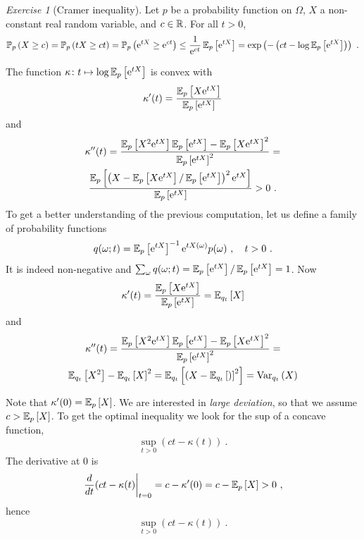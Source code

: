 \documentclass[12pt,a4paper]{amsart}
\theoremstyle{plain}%
\theoremstyle{definition}
\theoremstyle{remark}
\newtheorem{exercise}{Exercise}
\begin{document}
\begin{exercise}[Cramer inequality] \label{ex:cramer}
Let $p$ be a probability function on $\Omega$, $X$ a non-constant real random variable, and $c \in \mathbb{R}$. For all $t > 0$,
\begin{equation*}
  \operatorname{\mathbb P}_{p}\left( X \geq c\right) = \operatorname{\mathbb P}_{p}\left(tX \geq ct\right) = \operatorname{\mathbb P}_{p}\left(\mathrm{e}^{tX} \geq \mathrm{e}^{ct}\right) \leq \frac1{\mathrm{e}^{ct}} \operatorname{\mathbb E}_{p}\left[\mathrm{e}^{tX}\right] = \exp\left(- \left(ct - \log\operatorname{\mathbb E}_{p}\left[\mathrm{e}^{tX}\right]\right)\right) \ . 
\end{equation*}

The function $\kappa \colon t \mapsto \log \operatorname{\mathbb E}_{p}\left[\mathrm{e}^{tX}\right]$ is convex with
\begin{equation*}
  \kappa'(t) = \frac{\operatorname{\mathbb E}_{p}\left[X \mathrm{e}^{tX}\right]}{\operatorname{\mathbb E}_{p}\left[\mathrm{e}^{tX}\right]} 
\end{equation*}
and
\begin{multline*}
  \kappa''(t) = \frac{\operatorname{\mathbb E}_{p}\left[X^2\mathrm{e}^{tX}\right]\operatorname{\mathbb E}_{p}\left[\mathrm{e}^{tX}\right] - \operatorname{\mathbb E}_{p}\left[X\mathrm{e}^{tX}\right]^2}{\operatorname{\mathbb E}_{p}\left[\mathrm{e}^{tX}\right]^2} = \\ \frac{\operatorname{\mathbb E}_{p}\left[\left(X - \operatorname{\mathbb E}_{p}\left[X \mathrm{e}^{tX}\right]/\operatorname{\mathbb E}_{p}\left[\mathrm{e}^{tX}\right] \right)^2 \mathrm{e}^{tX}\right]}{\operatorname{\mathbb E}_{p}\left[\mathrm{e}^{tX}\right]} > 0 \ .
\end{multline*}
To get a better understanding of the previous computation, let us define a family of probability functions
\begin{equation*}
  q(\omega;t) = \operatorname{\mathbb E}_{p}\left[\mathrm{e}^{tX}\right]^{-1} \mathrm{e}^{tX(\omega)} p(\omega) \ , \quad t >0 \ .
\end{equation*}
It is indeed non-negative and $\sum_\omega q(\omega;t) = \operatorname{\mathbb E}_{p}\left[\mathrm{e}^{tX}\right] / \operatorname{\mathbb E}_{p}\left[\mathrm{e}^{tX}\right] = 1$. Now
\begin{equation*}
  \kappa'(t) = \frac{\operatorname{\mathbb E}_{p}\left[X \mathrm{e}^{tX}\right]}{\operatorname{\mathbb E}_{p}\left[\mathrm{e}^{tX}\right]} = \operatorname{\mathbb E}_{q_t}\left[X\right] 
\end{equation*}
and
\begin{multline*}
  \kappa''(t) = \frac{\operatorname{\mathbb E}_{p}\left[X^2\mathrm{e}^{tX}\right]\operatorname{\mathbb E}_{p}\left[\mathrm{e}^{tX}\right] - \operatorname{\mathbb E}_{p}\left[X\mathrm{e}^{tX}\right]^2}{\operatorname{\mathbb E}_{p}\left[\mathrm{e}^{tX}\right]^2} = \\ \operatorname{\mathbb E}_{q_t}\left[X^2\right] - \operatorname{\mathbb E}_{q_t}\left[X\right] ^2 = \operatorname{\mathbb E}_{q_t}\left[(X - \operatorname{\mathbb E}_{q_t}\left[)\right]^2\right] = \operatorname{Var}_{q_t}\left(X\right) \end{multline*}

Note that $\kappa'(0) = \operatorname{\mathbb E}_{p}\left[X\right]$. We are interested in \emph{large deviation}, so that we assume $c > \operatorname{\mathbb E}_{p}\left[X\right]$.
To get the optimal inequality we look for the sup of a concave function,
\begin{equation*}
  \sup_{t > 0}{(ct - \kappa(t))} \ .
\end{equation*}
The derivative at 0 is
\begin{equation*}
  \left. \frac{d}{dt} (ct - \kappa(t) \right|_{t=0} = c - \kappa'(0) = c - \operatorname{\mathbb E}_{p}\left[X\right] > 0 \ ,
\end{equation*}
hence
\begin{equation*}
  \sup_{t > 0}{(ct - \kappa(t))} \ .
\end{equation*}


\end{exercise}
\end{document}
